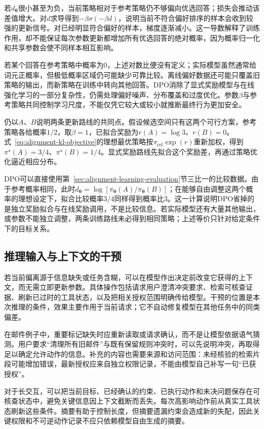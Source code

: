 若$d_{\bm{\theta}}$很小甚至为负，当前策略相对于参考策略仍不够偏向优选回答；损失会推动该差值增大。对$d$求导得到$-\beta\sigma(-\beta d)$，说明当前不符合偏好排序的样本会收到较强的更新信号。对已经明显符合偏好的样本，梯度逐渐减小。这一导数解释了训练作用，却不能保证每次参数更新都增加所有优选回答的绝对概率，因为概率归一化和共享参数会使不同样本相互影响。

若某个回答在参考策略中概率为0，上述对数比便没有定义；实际模型虽然通常给词元正概率，但极低概率区域仍可能缺少可靠比较。离线偏好数据还可能只覆盖旧策略的输出，而新策略在训练中转向其他回答。DPO消除了显式奖励模型与在线强化学习的一部分复杂性，仍需处理偏好噪声、分布覆盖和过度优化。参数$\beta$与参考策略共同控制学习尺度，不能仅凭它较大或较小就推断最终行为更加安全。

仍以$A$、$B$说明两条更新路线的共同点。假设候选空间只有这两个可行方案，参考策略各给概率$1/2$，取$\beta=1$，已拟合奖励为$r(A)=\log 3$、$r(B)=0$。式~\eqref{eq:alignment-kl-objective}的理想最优策略按$\pi_{\mathrm{ref}}\exp(r)$重新加权，得到$\pi^\star(A)=3/4$、$\pi^\star(B)=1/4$。显式奖励路线先拟合这个奖励差，再通过策略优化逼近相应分布。

DPO可以直接使用第~\ref{sec:alignment-learning-evaluation}节三比一的比较数据。由于参考概率相同，此时$d_{\bm\theta}=\log[\pi_{\bm\theta}(A)/\pi_{\bm\theta}(B)]$；在能够自由调整这两个概率的理想设定下，拟合比较概率$3/4$同样得到概率比3。这一计算说明DPO省掉的是独立奖励拟合与在线奖励调用，不是比较信息。若实际模型还有大量其他输出，或参数不能独立调整，两条训练路线未必得到相同策略；上述等价只针对给定条件下的目标关系。

\subsection{推理输入与上下文的干预}
\label{sec:alignment-intervention-context}

若当前偏离源于信息缺失或任务含糊，可以在模型作出决定前改变它获得的上下文，而无需立即更新参数。具体操作包括请求用户澄清冲突要求、检索可核查证据、刷新已过时的工具状态，以及把相关授权范围明确传给模型。干预的位置是本次推理的条件，效果主要作用于当前请求；它不自动修复模型在其他任务中的同类偏差。

在邮件例子中，重要标记缺失时应重新读取或请求确认，而不是让模型依据语气猜测。用户要求“清理所有旧邮件”与既有保留规则冲突时，可以先说明冲突，再取得足以确定允许动作的信息。补充的内容也需要来源和访问范围：未经核验的检索片段可能增加错误，最新授权应来自独立权限记录，不能由模型自己补写一句“已获授权”。

对于长交互，可以把当前目标、已经确认的约束、已执行动作和未决问题保存在可核查状态中，避免关键信息因上下文截断而丢失。每次高影响动作前从真实工具状态刷新这些条件。摘要有助于控制长度，但摘要遗漏约束会造成新的失配，因此关键权限和不可逆动作记录不应只依赖模型自由生成的摘要。

